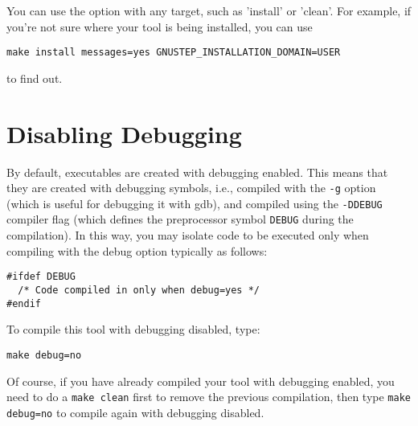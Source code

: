 \documentclass[a4paper]{article}
\begin{document}
You can use the option with any target, such as 'install' or 'clean'.  For
example, if you're not sure where your tool is being installed, you can use
\begin{verbatim}
make install messages=yes GNUSTEP_INSTALLATION_DOMAIN=USER
\end{verbatim}
to find out.

\section{Disabling Debugging}
By default, executables are created with debugging enabled.  This
means that they are created with debugging symbols, i.e., compiled
with the \texttt{-g} option (which is useful for debugging it with gdb), and
compiled using the \texttt{-DDEBUG} compiler flag (which defines the
preprocessor symbol \texttt{DEBUG} during the compilation).
In this way, you may isolate code to be executed only when compiling
with the debug option typically as follows:
\begin{verbatim}
#ifdef DEBUG 
  /* Code compiled in only when debug=yes */
#endif
\end{verbatim}
To compile this tool with debugging disabled, type:
\begin{verbatim}
make debug=no
\end{verbatim}
Of course, if you have already compiled your tool with debugging
enabled, you need to do a \texttt{make clean} first to remove the
previous compilation, then type \texttt{make debug=no} to compile
again with debugging disabled.
\end{document}
